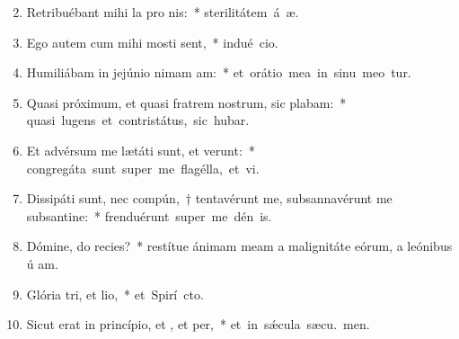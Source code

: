 \begin{flushleft}
\begin{enumerate}[leftmargin=*]
\setcounter{enumi}{1}

\item Retribuébant mihi la pro nis:~* \mbox{sterilitátem á æ.}
\item Ego autem cum mihi mosti sent,~* \mbox{indué cio.}
\item Humiliábam in jejúnio nimam am:~* \mbox{et orátio mea in sinu meo tur.}
\item Quasi próximum, et quasi fratrem nostrum, sic plabam:~* \mbox{quasi lugens et contristátus, sic hubar.}
\item Et advérsum me lætáti sunt, et verunt:~* \mbox{congregáta sunt super me flagélla, et vi.}
\item Dissipáti sunt, nec compún,~† tentavérunt me, subsannavérunt me subsantine:~* \mbox{frenduérunt super me dén is.}
\item Dómine, do recies?~* restítue ánimam meam a malignitáte eórum, a leónibus ú am.
\item Glória tri, et lio,~* \mbox{et Spirí cto.}
\item Sicut erat in princípio, et , et per,~* \mbox{et in s\'{\ae}cula sæcu. men.}

\end{enumerate}
\end{flushleft}

